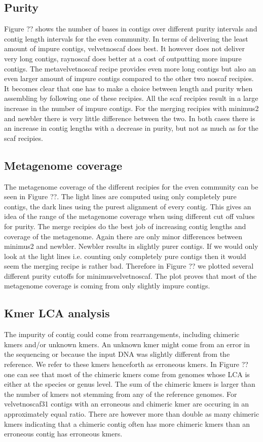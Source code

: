 \subsection*{Purity}
Figure ?? shows the number of bases in contigs over different purity intervals
and contig length intervals for the even community. In terms of delivering the
least amount of impure contigs, velvetnoscaf does best. It however does not
deliver very long contigs, raynoscaf does better at a cost of outputting more
impure contigs. The metavelvetnoscaf recipe provides even more long contigs
but also an even larger amount of impure contigs compared to the other two
noscaf recipies. It becomes clear that one has to make a choice between
length and purity when assembling by following one of these recipies. All the
scaf recipies result in a large increase in the number of impure contigs. For
the merging recipies with minimus2 and newbler there is very little
difference between the two. In both cases there is an increase in contig
lengths with a decrease in purity, but not as much as for the scaf recipies.

\subsection*{Metagenome coverage}
The metagenome coverage of the different recipies for the even community can
be seen in Figure ??.  The light lines are computed using only completely pure
contigs, the dark lines using the purest alignment of every contig. This gives
an idea of the range of the metagenome coverage when using different cut off
values for purity. The merge recipies do the best job of increasing contig
lengths and coverage of the metagenome. Again there are only minor differences
between minimus2 and newbler. Newbler results in slightly purer contigs. If we
would only look at the light lines i.e. counting only completely pure contigs
then it would seem the merging recipe is rather bad. Therefore in Figure ??
we plotted several different purity cutoffs for minimusvelvetnoscaf. The plot
proves that most of the metagenome coverage is coming from only slightly impure
contigs.

\subsection*{Kmer LCA analysis}
The impurity of contig could come from rearrangements, including chimeric kmers
and/or unknown kmers. An unknown kmer might come from an error in the
sequencing or because the input DNA was slightly different from the reference.
We refer to these kmers henceforth as erroneous kmers. In Figure ?? one can see
that most of the chimeric kmers come from genomes whose LCA is either at the
species or genus level. The sum of the chimeric kmers is larger than the number
of kmers not stemming from any of the reference genomes. For velvetnoscaf31
contigs with an erroneous and chimeric kmer are occuring in an approximately
equal ratio. There are however more than double as many chimeric kmers
indicating that a chimeric contig often has more chimeric kmers than an
erroneous contig has erroneous kmers.

